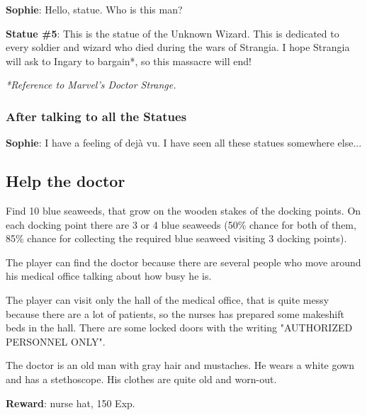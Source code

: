 \textbf{Sophie}: Hello, statue. Who is this man?

\textbf{Statue \#{}5}: This is the statue of the Unknown Wizard. This is dedicated to every soldier and wizard who died during the wars of Strangia. I hope Strangia will ask to Ingary to bargain*, so this massacre will end!

\textit{*Reference to Marvel\texttrademark 's Doctor Strange.}

\subsubsection*{After talking to all the Statues}
\textbf{Sophie}: I have a feeling of dejà vu. I have seen all these statues somewhere else...


\subsection{Help the doctor}
Find 10 blue seaweeds, that grow on the wooden stakes of the docking points. On each docking point there are 3 or 4 blue seaweeds (50\% chance for both of them, 85\% chance for collecting the required blue seaweed visiting 3 docking points).

The player can find the doctor because there are several people who move around his medical office talking about how busy he is.

The player can visit only the hall of the medical office, that is quite messy because there are a lot of patients, so the nurses has prepared some makeshift beds in the hall. There are some locked doors with the writing "AUTHORIZED PERSONNEL ONLY".

The doctor is an old man with gray hair and mustaches. He wears a white gown and has a stethoscope. His clothes are quite old and worn-out.

\textbf{Reward}: nurse hat, 150 Exp.

